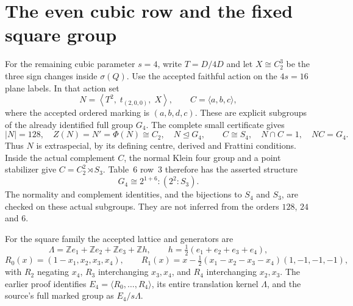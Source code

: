\documentclass[11pt]{article}
\newcommand{\C}{C}\newcommand{\Z}{\mathbb Z}
\begin{document}
\section{The even cubic row and the fixed square group}
For the remaining cubic parameter $s=4$, write $T=D/4D$ and let
$X\cong\C_2^3$ be the three sign changes inside $\sigma(Q)$. Use the
accepted faithful action on the $4s=16$ plane labels. In that action set
\[
 N=\left\langle T^2,\;t_{(2,0,0)},\;X\right\rangle,
 \qquad C=\langle a,b,c\rangle,
\]
where the accepted ordered marking is $(a,b,d,c)$. These are explicit
subgroups of the already identified full group $G_4$.
The complete small certificate gives
\[
 |N|=128,\quad Z(N)=N'=\Phi(N)\cong\C_2,\quad N\trianglelefteq G_4,
 \qquad C\cong S_4,\quad N\cap C=1,\quad NC=G_4.
\]
Thus $N$ is extraspecial, by its defining centre, derived and Frattini
conditions. Inside the actual complement $C$, the normal Klein four
group and a point stabilizer give $C=\C_2^2\rtimes S_3$. Table~6 row~3
therefore has the asserted structure
\[
 G_4\cong 2^{1+6}:(2^2:S_3).
\]
The normality and complement identities, and the bijections to $S_4$
and $S_3$, are checked on these actual subgroups. They are not inferred
from the orders $128$, $24$ and $6$.

For the square family the accepted lattice and generators are
\[
 \Lambda=\Z e_1+\Z e_2+\Z e_3+\Z h,\qquad
 h=\tfrac12(e_1+e_2+e_3+e_4),
\]
\[
 R_0(x)=(1-x_1,x_2,x_3,x_4),\qquad
 R_1(x)=x-\tfrac12(x_1-x_2-x_3-x_4)(1,-1,-1,-1),
\]
with $R_2$ negating $x_4$, $R_3$ interchanging $x_3,x_4$, and $R_4$
interchanging $x_2,x_3$. The earlier proof identifies
$E_4=\langle R_0,\ldots,R_4\rangle$, its entire translation kernel
$\Lambda$, and the source's full marked group as $E_4/s\Lambda$.
\end{document}
